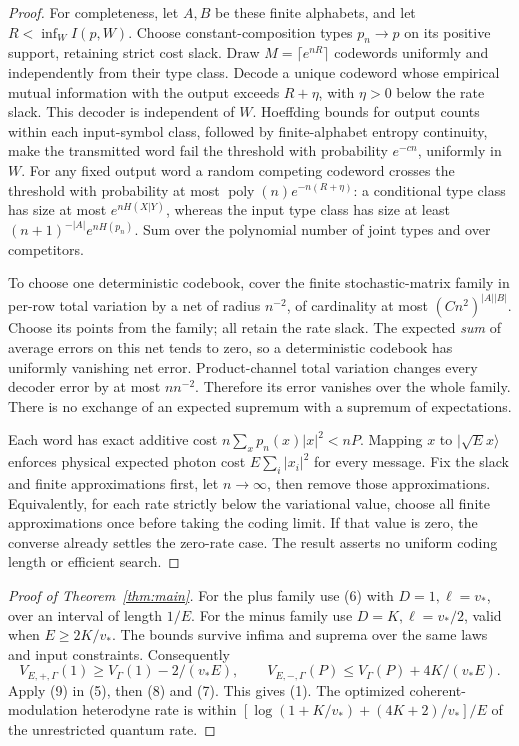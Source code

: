 \documentclass[11pt]{article}
\begin{document}
\begin{proof}
For completeness, let \(A,B\) be these finite alphabets, and let
\(R<\inf_W I(p,W)\). Choose constant-composition types \(p_n\to p\)
on its positive support, retaining strict cost slack.
Draw \(M=\lceil e^{nR}\rceil\) codewords uniformly and independently
from their type class. Decode a unique codeword whose empirical mutual
information with the output exceeds \(R+\eta\), with \(\eta>0\)
below the rate slack. This decoder is independent of \(W\).
Hoeffding bounds for output counts within each input-symbol class,
followed by finite-alphabet entropy continuity, make the transmitted
word fail the threshold with probability \(e^{-cn}\), uniformly in \(W\).
For any fixed output word a random competing codeword crosses the
threshold with probability at most
\(\operatorname{poly}(n)e^{-n(R+\eta)}\):
a conditional type class has size at most \(e^{nH(X|Y)}\),
whereas the input type class has size at least
\((n+1)^{-|A|}e^{nH(p_n)}\). Sum over the polynomial number of joint
types and over competitors.

To choose one deterministic codebook, cover the finite stochastic-matrix
family in per-row total variation by a net of radius \(n^{-2}\),
of cardinality at most \((Cn^2)^{|A||B|}\).
Choose its points from the family; all retain the rate slack.
The expected \emph{sum} of average errors on this net tends to zero,
so a deterministic codebook has uniformly vanishing net error.
Product-channel total variation changes every decoder error by at most
\(n n^{-2}\). Therefore its error vanishes over the whole family.
There is no exchange of an expected supremum with a supremum of expectations.

Each word has exact additive cost \(n\sum_xp_n(x)|x|^2<nP\).
Mapping \(x\) to \(|\sqrt E x\rangle\) enforces physical expected
photon cost \(E\sum_i|x_i|^2\) for every message.
Fix the slack and finite approximations first, let \(n\to\infty\),
then remove those approximations. Equivalently, for each rate strictly
below the variational value, choose all finite approximations once before
taking the coding limit. If that value is zero, the converse already
settles the zero-rate case. The result asserts no uniform
coding length or efficient search.
\end{proof}

\begin{proof}[Proof of Theorem~\ref{thm:main}]
For the plus family use (6) with \(D=1,\ell=v_*\), over an interval
of length \(1/E\). For the minus family use \(D=K,\ell=v_*/2\),
valid when \(E\geq2K/v_*\). The bounds survive infima and suprema over
the same laws and input constraints. Consequently
\[
 V_{E,+,\Gamma}(1)\geq V_\Gamma(1)-2/(v_*E),\qquad
 V_{E,-,\Gamma}(P)\leq V_\Gamma(P)+4K/(v_*E).
\]
Apply (9) in (5), then (8) and (7). This gives (1).
The optimized coherent-modulation heterodyne rate is within
\([\log(1+K/v_*)+(4K+2)/v_*]/E\) of the unrestricted quantum rate.
\end{proof}
\end{document}

